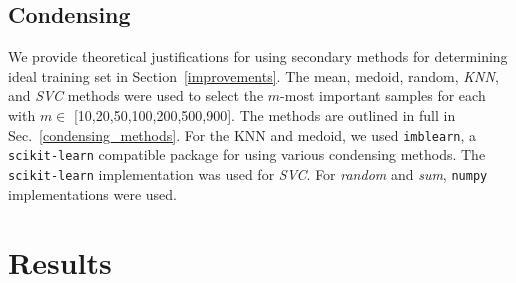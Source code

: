 \documentclass[conference]{IEEEtran}
\begin{document}
\subsection{Condensing}
\label{condensing}
We provide theoretical justifications for using secondary methods for determining ideal training set in Section~\ref{improvements}. The mean, medoid, random, \textit{KNN}, and \textit{SVC} methods were used to select the $m$-most important samples for each with $m \in$ [10,20,50,100,200,500,900]. The methods are outlined in full in Sec.~\ref{condensing_methods}. For the KNN and medoid, we used \texttt{imblearn}, a \texttt{scikit-learn} compatible package for using various condensing methods. The \texttt{scikit-learn} implementation was used for \textit{SVC}. For \textit{random} and \textit{sum}, \texttt{numpy} implementations were used.


\section{Results}
\label{results}
\end{document}
